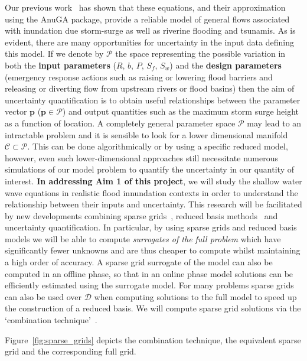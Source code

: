 Our previous work~\parencite{anugamanual,nielsen2005hydrodynamic} has shown that these
equations, and their approximation using the  AnuGA package, provide a reliable
model of general flows associated with inundation due storm-surge as well as riverine flooding and tsunamis.
As is evident, there are many opportunities for uncertainty in the input data defining this model. 
If we denote by $\mathcal{P}$ the space representing the possible variation in both the {\bf input parameters} ($R$, $b$, $P$, $S_f$, $S_w$) and the {\bf design parameters} (emergency response actions such as raising or lowering flood barriers and releasing or diverting flow from upstream rivers or flood basins) then the aim of uncertainty quantification is to obtain useful relationships between the parameter vector $\mathbf{p}$
($\mathbf{p} \in \mathcal{P}$) and output quantities such as the maximum storm surge height as a function of location. 
A completely general parameter space $\mathcal{P}$ may lead to an intractable problem and it is sensible to look for a lower dimensional manifold $\mathcal{C} \subset \mathcal{P}$.
This can be done algorithmically or by using a specific reduced model, however, even such lower-dimensional approaches still necessitate numerous simulations of our model problem to quantify the uncertainty in our quantity of interest. {\bf In addressing Aim 1 of this project}, we will study the shallow water wave equations in realistic flood innundation contexts in order to understand the relationship between their inputs and uncertainty. This research will be facilitated by new
developments combining sparse
grids~\parencite{BungartzGriebel2004}, reduced basis
methods~\parencite{LiebermanEtal2010,Peherstorfer2013,ChenSchwab2015,PeherstorferWillcox2015}
and uncertainty quantification.
 In particular, by using sparse
grids and reduced basis models we will be able to compute
\emph{surrogates of the full problem} which have significantly fewer
unknowns and are thus cheaper to compute whilst maintaining a high
order of accuracy. 
A sparse grid surrogate of
the model  can also be computed in an offline phase,
so that in an online phase model solutions can be efficiently
estimated using the surrogate model. For many problems sparse grids
can also be used over $\mathcal{D}$ when computing solutions to the full
model to speed up the construction of a reduced basis. We will compute
sparse grid solutions via the `combination
technique'~\parencite{Griebel1990}. 

 \iffalse
 
 Figure~\ref{fig:sparse_grids}
depicts the combination technique, the equivalent sparse grid and the
corresponding full grid.
 
